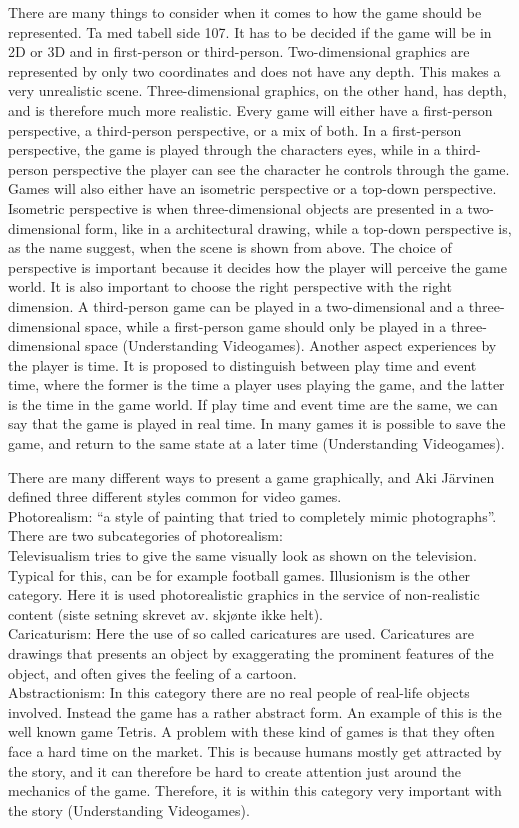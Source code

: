There are many things to consider when it comes to how the game should be represented. Ta med tabell side 107.  It has to be decided if the game will be in 2D or 3D and in first-person or third-person. Two-dimensional graphics are represented by only two coordinates and does not have any depth. This makes a very unrealistic scene. Three-dimensional graphics, on the other hand, has depth, and is therefore much more realistic. Every game will either have a first-person perspective, a third-person perspective, or a mix of both. In a first-person perspective, the game is played through the characters eyes, while in a third-person perspective the player can see the character he controls through the game. Games will also either have an isometric perspective or a top-down perspective. Isometric perspective is when three-dimensional objects are presented in a two-dimensional form, like in a architectural drawing, while a top-down perspective is, as the name suggest, when the scene is shown from above. The choice of perspective is important because it decides how the player will perceive the game world. It is also important to choose the right perspective with the right dimension. A third-person game can be played in a two-dimensional and a three-dimensional space, while a first-person game should only be played in a three-dimensional space (Understanding Videogames). Another aspect experiences by the player is time. It is proposed to distinguish between play time and event time, where the former is the time a player uses playing the game, and the latter is the time in the game world. If play time and event time are the same, we can say that the game is played in real time. In many games it is possible to save the game, and return to the same state at a later time (Understanding Videogames).

There are many different ways to present a game graphically, and Aki Järvinen defined three different styles common for video games. \\ 
Photorealism: “a style of painting that tried to completely mimic photographs”. There are two subcategories of photorealism: \\
Televisualism tries to give the same visually look as shown on the television. Typical for this, can be for example football games. Illusionism is the other category. Here it is used photorealistic graphics in the service of non-realistic content (siste setning skrevet av. skjønte ikke helt). \\
Caricaturism: Here the use of so called caricatures are used. Caricatures are drawings that presents an object by exaggerating the prominent features of the object, and often gives the feeling of a cartoon. \\
Abstractionism: In this category there are no real people of real-life objects involved. Instead  the game has a rather abstract form. An example of this is the well known game Tetris. A problem with these kind of games is that they often face a hard time on the market. This is because humans mostly get attracted by the story, and it can therefore be hard to create attention just around the mechanics of the game. Therefore, it is within this category very important with the story (Understanding Videogames). 


